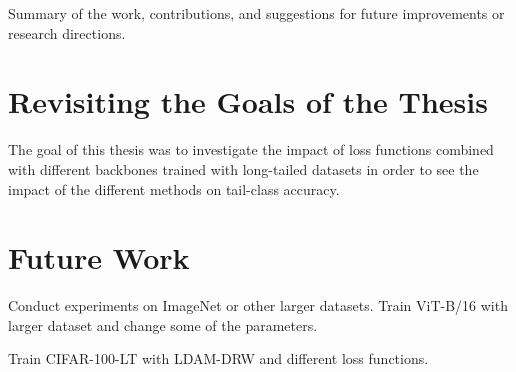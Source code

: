 
Summary of the work, contributions, and suggestions for future improvements or research directions.

\section{Revisiting the Goals of the Thesis}
The goal of this thesis was to investigate the impact of loss functions combined with different backbones trained with long-tailed datasets in order to see the impact of the different methods on tail-class accuracy. 


\section{Future Work}
Conduct experiments on ImageNet or other larger datasets. Train ViT-B/16 with larger dataset and change some of the parameters.

Train CIFAR-100-LT with LDAM-DRW and different loss functions. 